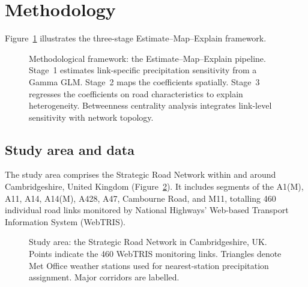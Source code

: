 \documentclass[review]{elsarticle}
\begin{document}
\section{Methodology}
\label{sec:method}

Figure~\ref{fig:framework} illustrates the three-stage Estimate--Map--Explain framework.

\begin{figure}[htbp]
\centering
\caption{Methodological framework: the Estimate--Map--Explain pipeline. Stage~1 estimates link-specific precipitation sensitivity from a Gamma GLM. Stage~2 maps the coefficients spatially. Stage~3 regresses the coefficients on road characteristics to explain heterogeneity. Betweenness centrality analysis integrates link-level sensitivity with network topology.}
\label{fig:framework}
\end{figure}


\subsection{Study area and data}
\label{sec:method:data}

The study area comprises the Strategic Road Network within and around Cambridgeshire, United Kingdom (Figure~\ref{fig:study_area}). It includes segments of the A1(M), A11, A14, A14(M), A428, A47, Cambourne Road, and M11, totalling 460 individual road links monitored by National Highways' Web-based Transport Information System (WebTRIS).

\begin{figure}[htbp]
\centering
\caption{Study area: the Strategic Road Network in Cambridgeshire, UK. Points indicate the 460 WebTRIS monitoring links. Triangles denote Met Office weather stations used for nearest-station precipitation assignment. Major corridors are labelled.}
\label{fig:study_area}
\end{figure}
\end{document}

